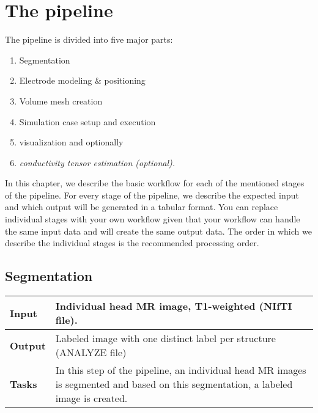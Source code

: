 \newcommand{\bit}[1]{\textit{\textbf{#1}}}

\section{The pipeline}
The pipeline is divided into five major parts:
\begin{enumerate}
    \item Segmentation
    \item Electrode modeling \& positioning
    \item Volume mesh creation
    \item Simulation case setup and execution
    \item visualization and optionally
    \item \it{conductivity tensor estimation (optional)}.
\end{enumerate}
In this chapter, we describe the basic workflow for each of the mentioned stages of the pipeline. For every stage of
the pipeline, we describe the expected input and which output will be generated in a tabular format. You can replace
individual stages with your own workflow given that your workflow can handle the same input data and will create the
same output data. The order in which we describe the individual stages is the recommended processing order.

\subsection{Segmentation}
\begin{tabular}{ | p{} || p{} | }
    \hline
    \textbf{Input}  & Individual head MR image, T1-weighted (NIfTI file).\\
    \hline
    \textbf{Output} & Labeled image with one distinct label per structure (ANALYZE file) \\ 
    \hline
    \textbf{Tasks} & In this step of the pipeline, an individual head MR images is segmented and based on
                     this segmentation, a labeled image is created. \\
    \hline
\end{tabular}

\hspace{0.5cm}


